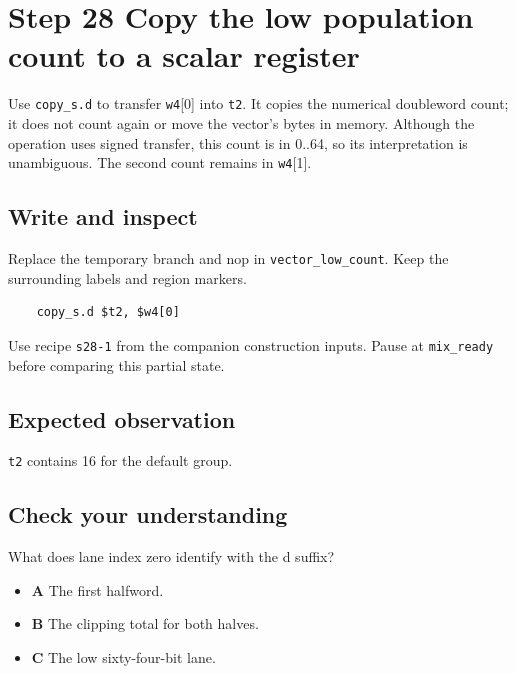 \section{Step 28 Copy the low population count to a scalar register}\label{pcm-s28}

Use \texttt{copy\_s.d} to transfer \texttt{w4}[0] into \texttt{t2}. It copies the numerical doubleword count; it does not count again or move the vector’s bytes in memory. Although the operation uses signed transfer, this count is in 0..64, so its interpretation is unambiguous. The second count remains in \texttt{w4}[1].

\subsection{Write and inspect}
Replace the temporary branch and nop in \texttt{vector\_low\_count}. Keep the surrounding labels and region markers.

\begin{verbatim}
    copy_s.d $t2, $w4[0]
\end{verbatim}
Use recipe \texttt{s28-1} from the companion construction inputs. Pause at \texttt{mix\_ready} before comparing this partial state.

\subsection{Expected observation}
\texttt{t2} contains 16 for the default group.

\subsection{Check your understanding}
What does lane index zero identify with the d suffix?

\begin{itemize}
  \item \textbf{A} The first halfword.
  \item \textbf{B} The clipping total for both halves.
  \item \textbf{C} The low sixty-four-bit lane.
\end{itemize}

